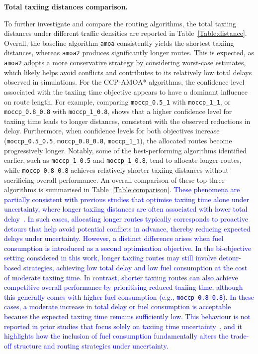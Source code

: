 \documentclass{article}
\newcommand*{\blue}{\textcolor{blue}}
\begin{document}
\vspace{0.5em}
\textbf{Total taxiing distances comparison.}
\vspace{0.5em}

To further investigate and compare the routing algorithms, the total taxiing distances under different traffic densities are reported in Table~\ref{Table:distance}. Overall, the baseline algorithm \texttt{amoa} consistently yields the shortest taxiing distances, whereas \texttt{amoa2} produces significantly longer routes. This is expected, as \texttt{amoa2} adopts a more conservative strategy by considering worst-case estimates, which likely helps avoid conflicts and contributes to its relatively low total delays observed in simulations. For the CCP-AMOA* algorithms, the confidence level associated with the taxiing time objective appears to have a dominant influence on route length. For example, comparing \texttt{moccp\_0.5\_1} with \texttt{moccp\_1\_1}, or \texttt{moccp\_0.8\_0.8} with \texttt{moccp\_1\_0.8}, shows that a higher confidence level for taxiing time leads to longer distances, consistent with the observed reductions in delay. Furthermore, when confidence levels for both objectives increase (\texttt{moccp\_0.5\_0.5}, \texttt{moccp\_0.8\_0.8}, \texttt{moccp\_1\_1}), the allocated routes become progressively longer. Notably, some of the best-performing algorithms identified earlier, such as \texttt{moccp\_1\_0.5} and \texttt{moccp\_1\_0.8}, tend to allocate longer routes, while \texttt{moccp\_0.8\_0.8} achieves relatively shorter taxiing distances without sacrificing overall performance. An overall comparison of these top three algorithms is summarised in Table~\ref{Table:comparison}. \blue{These phenomena are partially consistent with previous studies that optimise taxiing time alone under uncertainty, where longer taxiing distances are often associated with lower total delay~\cite{wang2021chance}. In such cases, allocating longer routes typically corresponds to proactive detours that help avoid potential conflicts in advance, thereby reducing expected delays under uncertainty. However, a distinct difference arises when fuel consumption is introduced as a second optimisation objective. In the bi-objective setting considered in this work, longer taxiing routes may still involve detour-based strategies, achieving low total delay and low fuel consumption at the cost of moderate taxiing time. In contrast, shorter taxiing routes can also achieve competitive overall performance by prioritising reduced taxiing time, although this generally comes with higher fuel consumption (e.g., \texttt{moccp\_0.8\_0.8}). In these cases, a moderate increase in total delay or fuel consumption is acceptable because the expected taxiing time remains sufficiently low. This behaviour is not reported in prior studies that focus solely on taxiing time uncertainty~\cite{wang2021chance}, and it highlights how the inclusion of fuel consumption fundamentally alters the trade-off structure and routing strategies under uncertainty.}
\end{document}
